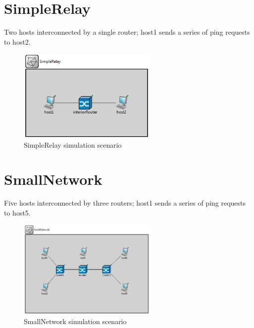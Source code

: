     \section{SimpleRelay}

        Two hosts interconnected by a single router; host1 sends a series of ping requests to host2.

        \begin{figure}[H]
            \begin{center}
                \includegraphics[width=0.6\textwidth]{fig/examples-simplerelay.png}
              \caption{SimpleRelay simulation scenario}
              \label{fig:examples:simplerelay}
            \end{center}
        \end{figure}

    \section{SmallNetwork}

        Five hosts interconnected by three routers; host1 sends a series of ping requests to host5.

        \begin{figure}[H]
            \begin{center}
                \includegraphics[width=0.6\textwidth]{fig/examples-smallnetwork.png}
              \caption{SmallNetwork simulation scenario}
              \label{fig:examples:smallnetwork}
            \end{center}
        \end{figure}

